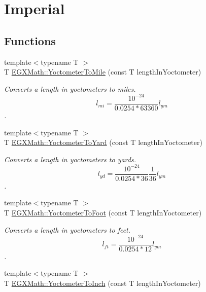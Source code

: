 \hypertarget{group___e_g_x_math-_conversions-_length_conversions-_yoctometer-_imperial}{}\section{Imperial}
\label{group___e_g_x_math-_conversions-_length_conversions-_yoctometer-_imperial}
\subsection*{Functions}
\begin{DoxyCompactItemize}
\item 
{\footnotesize template$<$typename T $>$ }\\T \mbox{\hyperlink{group___e_g_x_math-_conversions-_length_conversions-_yoctometer-_imperial_gae40e8cf52937348b127013a3dbe89105}{E\+G\+X\+Math\+::\+Yoctometer\+To\+Mile}} (const T length\+In\+Yoctometer)
\begin{DoxyCompactList}\small\item\em Converts a length in yoctometers to miles. \[ l_{mi}=\frac{10^{-24}}{0.0254 * 63360} l_{ym} \]. \end{DoxyCompactList}\item 
{\footnotesize template$<$typename T $>$ }\\T \mbox{\hyperlink{group___e_g_x_math-_conversions-_length_conversions-_yoctometer-_imperial_gaa9c695208d05175797ee88adef7bd5f2}{E\+G\+X\+Math\+::\+Yoctometer\+To\+Yard}} (const T length\+In\+Yoctometer)
\begin{DoxyCompactList}\small\item\em Converts a length in yoctometers to yards. \[ l_{yd}= \frac{10^{-24}}{0.0254 * 36} \frac{1}{36} l_{ym} \]. \end{DoxyCompactList}\item 
{\footnotesize template$<$typename T $>$ }\\T \mbox{\hyperlink{group___e_g_x_math-_conversions-_length_conversions-_yoctometer-_imperial_gad8cb5223284af20fc0d29fefa17ec091}{E\+G\+X\+Math\+::\+Yoctometer\+To\+Foot}} (const T length\+In\+Yoctometer)
\begin{DoxyCompactList}\small\item\em Converts a length in yoctometers to feet. \[ l_{ft}= \frac{10^{-24}}{0.0254 * 12} l_{ym} \]. \end{DoxyCompactList}\item 
{\footnotesize template$<$typename T $>$ }\\T \mbox{\hyperlink{group___e_g_x_math-_conversions-_length_conversions-_yoctometer-_imperial_gaaaba7544cf3189cd374782786a13646c}{E\+G\+X\+Math\+::\+Yoctometer\+To\+Inch}} (const T length\+In\+Yoctometer)

\end{DoxyCompactItemize}
